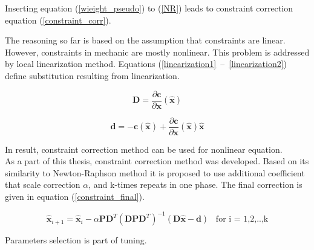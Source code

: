 Inserting equation (\ref{wieight_pseudo}) to (\ref{NR}) leads to constraint correction equation (\ref{constraint_corr}).

The reasoning so far is based on the assumption that constraints are linear. 
However, constraints in mechanic are mostly nonlinear. This problem is addressed by local linearization method. Equations \mbox{(\ref{linearization1} -- \ref{linearization2})} define substitution resulting from linearization.

\begin{equation}
	\bm{D} = \frac{\partial \bm{c}}{\partial \bm{x}}(\bm{\hat{x}})
	\label{linearization1}
\end{equation}

\begin{equation}
	\bm{d} =  - \bm{c} (\bm{\hat{x}}) +  \frac{\partial \bm{c}}{\partial \bm{x}}(\bm{\hat{x}}) \bm{\hat{x}}
	\label{linearization2}
\end{equation}

In result, constraint correction method can be used for nonlinear equation.\\ 

As a part of this thesis, constraint correction method was developed. Based on its similarity to Newton-Raphson method it is proposed to use additional coefficient that scale correction $\alpha$, and k-times repeats in one phase. The final correction is given in equation (\ref{constraint_final}).

\begin{equation}
	\bm{\hat{x}}_{i+1} = \bm{\hat{x}}_{i} - \alpha \bm{P} \bm{D}^T \left( \bm{D} \bm{P} \bm{D}^T \right)^{-1} \left( \bm{D} \bm{\hat{x}} - \bm{d}  \right) \hspace{10pt} \text{for i = 1,2,..,k}
	\label{constraint_final}
\end{equation}

 Parameters selection is part of tuning.  